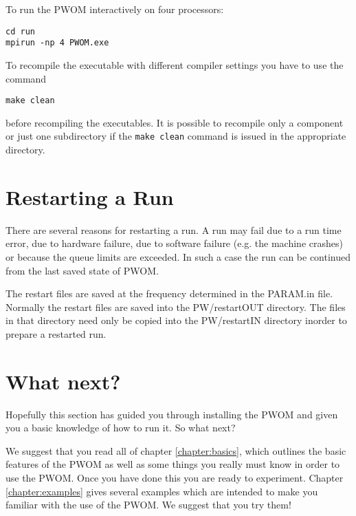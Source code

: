 To run the PWOM interactively on four processors:
\begin{verbatim}
cd run
mpirun -np 4 PWOM.exe
\end{verbatim}

To recompile the executable with different compiler settings you have
to use the command
\begin{verbatim}
make clean
\end{verbatim}
before recompiling the executables. It is possible to recompile
only a component or just one subdirectory if the {\tt make clean}
command is issued in the appropriate directory.

\section{Restarting a Run}

There are several reasons for restarting a run. A run may fail
due to a run time error, due to hardware failure, due to 
software failure (e.g. the machine crashes) or because the
queue limits are exceeded. In such a case the run can be continued from
the last saved state of PWOM. 

The restart files are saved at the frequency determined in the PARAM.in file.
Normally the restart files are saved into the PW/restartOUT directory. 
The files in that directory need only be copied into the PW/restartIN 
directory inorder to prepare a restarted run.

\section{What next?}

Hopefully this section has guided you through installing the PWOM and
given you a basic knowledge of how to run it.  So what next?

We suggest that you read all of chapter \ref{chapter:basics}, which
outlines the basic features of the PWOM as well as some things you
really must know in order to use the PWOM.  Once you have done this you
are ready to experiment.  Chapter \ref{chapter:examples} gives several 
examples which are intended to make you familiar with the use of the
PWOM.  We suggest that you try them!

%
